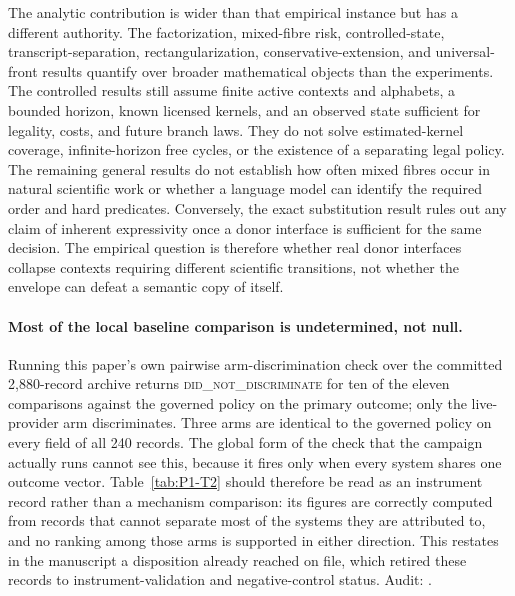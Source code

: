 The analytic contribution is wider than that empirical instance but has a
different authority. The factorization, mixed-fibre risk, controlled-state,
transcript-separation, rectangularization, conservative-extension, and
universal-front results quantify over broader mathematical objects than the
experiments. The controlled results still assume finite active contexts and
alphabets, a bounded horizon, known licensed kernels, and an observed state
sufficient for legality, costs, and future branch laws. They do not solve
estimated-kernel coverage, infinite-horizon free cycles, or the existence of a
separating legal policy. The remaining general results do not
establish how often mixed fibres occur in natural scientific work or whether a
language model can identify the required order and hard predicates. Conversely,
the exact substitution result rules out any claim of inherent expressivity once
a donor interface is sufficient for the same decision. The empirical question
is therefore whether real donor interfaces collapse contexts requiring
different scientific transitions, not whether the envelope can defeat a
semantic copy of itself.

\paragraph{Most of the local baseline comparison is undetermined, not null.}
Running this paper's own pairwise arm-discrimination check over the committed
2,880-record archive returns \textsc{did\_not\_discriminate} for ten of the eleven
comparisons against the governed policy on the primary outcome; only the
live-provider arm discriminates. Three arms are identical to the governed policy on
every field of all 240 records. The global form of the check that the campaign
actually runs cannot see this, because it fires only when every system shares one
outcome vector. Table~\ref{tab:P1-T2} should therefore be read as an instrument
record rather than a mechanism comparison: its figures are correctly computed from
records that cannot separate most of the systems they are attributed to, and no
ranking among those arms is supported in either direction. This restates in the
manuscript a disposition already reached on file, which retired these records to
instrument-validation and negative-control status. Audit:
.


